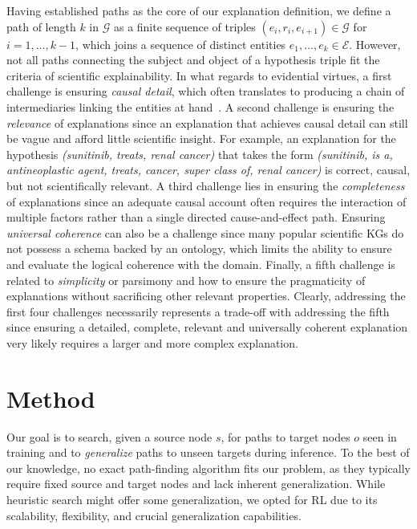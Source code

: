 \documentclass{article}
\theoremstyle{definition}
\newcommand{\G}{\mathcal{G}}
\begin{document}
Having established paths as the core of our explanation definition, we define a path of length $k$ in $\G$ as a finite sequence of triples $(e_i,r_i,e_{i+1}) \in \G$ for $i=1,\dots,k-1$, which joins a sequence of distinct entities $e_1, \dots, e_k \in \mathcal{E}$.
However, not all paths connecting the subject and object of a hypothesis triple fit the criteria of scientific explainability. 
In what regards to evidential virtues, a first challenge is ensuring \textit{causal detail}, which often translates to producing a chain of intermediaries linking the entities at hand~\cite{rosales2021scientific}. A second challenge is ensuring the \textit{relevance} of explanations since an explanation that achieves causal detail can still be vague and afford little scientific insight. For example, an explanation for the hypothesis \textit{(sunitinib, treats, renal cancer)} that takes the form \textit{(sunitinib, is a, antineoplastic agent, treats, cancer, super class of, renal cancer)} is correct, causal, but not scientifically relevant. A third challenge lies in ensuring the \textit{completeness} of explanations since an adequate causal account often requires the interaction of multiple factors rather than a single directed cause-and-effect path.
Ensuring \textit{universal coherence} can also be a challenge since many popular scientific KGs do not possess a schema backed by an ontology, which limits the ability to ensure and evaluate the logical coherence with the domain. Finally, a fifth challenge is related to \textit{simplicity} or parsimony and how to ensure the pragmaticity of explanations without sacrificing other relevant properties. Clearly, addressing the first four challenges necessarily represents a trade-off with addressing the fifth since ensuring a detailed, complete, relevant and universally coherent explanation very likely requires a larger and more complex explanation. 



\section{Method}
Our goal is to search, given a source node $s$, for paths to target nodes $o$ seen in training and to \emph{generalize} paths to unseen targets during inference. To the best of our knowledge, no exact path-finding algorithm fits our problem, as they typically require fixed source and target nodes and lack inherent generalization. While heuristic search might offer some generalization, we opted for RL due to its scalability, flexibility, and crucial generalization capabilities.
\end{document}
